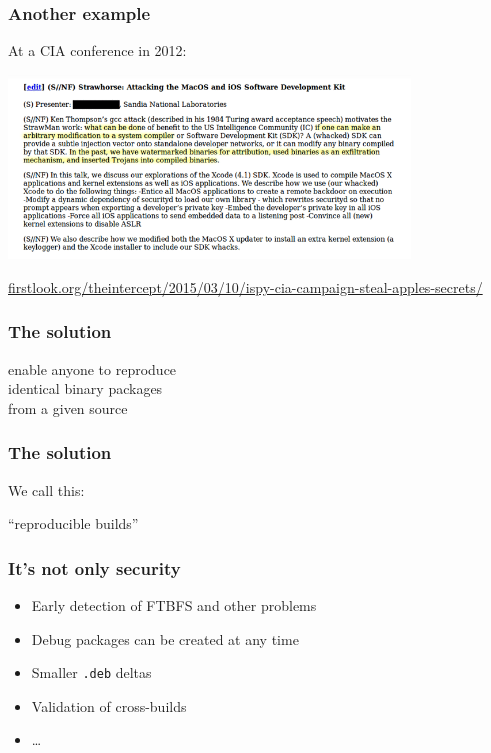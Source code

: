 \documentclass[14pt]{beamer}
\begin{document}
\begin{frame}[fragile]
 \frametitle{Another example}

 At a CIA conference in 2012:
 \begin{center}
  \includegraphics[width=0.8\textwidth]{images/strawhorse.png}

  {\footnotesize
  \url{firstlook.org/theintercept/2015/03/10/ispy-cia-campaign-steal-apples-secrets/}
  }
 \end{center}
\end{frame}

\begin{frame}
 \frametitle{The solution}

 \begin{center}
 \Large
 enable anyone to reproduce\\
 identical binary packages\\
 from a given source
\end{center}

\end{frame}

\begin{frame}
 \frametitle{The solution}

 \begin{center}
 We call this:

 \Huge
 “reproducible builds”
 \end{center}
\end{frame}

\begin{frame}
 \frametitle{It's not only security}

 \begin{itemize}
  \item Early detection of FTBFS and other problems
  \item Debug packages can be created at any time
  \item Smaller \texttt{.deb} deltas
  \item Validation of cross-builds
  \item …
 \end{itemize}
\end{frame}
\end{document}
